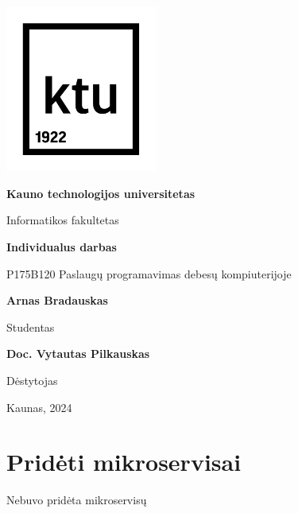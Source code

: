\documentclass[14pt]{extarticle}
\begin{document}
\begin{titlepage}
	\begin{center}
		\includegraphics[width=5cm]{images/ktu_logo.png}

		\textbf{Kauno technologijos universitetas}

		Informatikos fakultetas

		\vspace{3cm}

		\textbf{Individualus darbas}

		\vspace{0.5cm}
		P175B120 Paslaugų programavimas debesų kompiuterijoje

	\end{center}

	\begin{flushright}

		\vfill

		\textbf{Arnas Bradauskas}

		Studentas

		\vspace{0.2cm}

		\textbf{Doc. Vytautas Pilkauskas}

		Dėstytojas

	\end{flushright}

	\begin{center}
		Kaunas, 2024
	\end{center}

\end{titlepage}

\tableofcontents

\clearpage

\section{Pridėti mikroservisai}

Nebuvo pridėta mikroservisų
\end{document}
